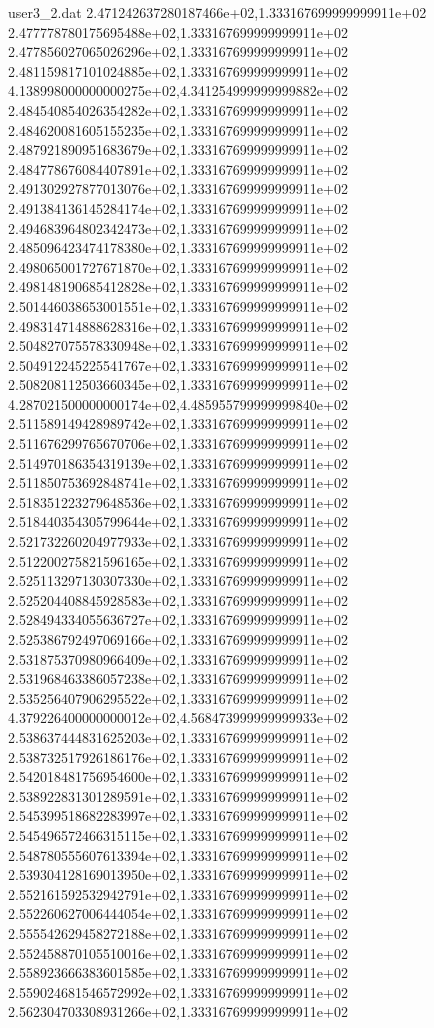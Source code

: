 \begin{filecontents}{user3_2.dat}
2.471242637280187466e+02,1.333167699999999911e+02
2.477778780175695488e+02,1.333167699999999911e+02
2.477856027065026296e+02,1.333167699999999911e+02
2.481159817101024885e+02,1.333167699999999911e+02
4.138998000000000275e+02,4.341254999999999882e+02
2.484540854026354282e+02,1.333167699999999911e+02
2.484620081605155235e+02,1.333167699999999911e+02
2.487921890951683679e+02,1.333167699999999911e+02
2.484778676084407891e+02,1.333167699999999911e+02
2.491302927877013076e+02,1.333167699999999911e+02
2.491384136145284174e+02,1.333167699999999911e+02
2.494683964802342473e+02,1.333167699999999911e+02
2.485096423474178380e+02,1.333167699999999911e+02
2.498065001727671870e+02,1.333167699999999911e+02
2.498148190685412828e+02,1.333167699999999911e+02
2.501446038653001551e+02,1.333167699999999911e+02
2.498314714888628316e+02,1.333167699999999911e+02
2.504827075578330948e+02,1.333167699999999911e+02
2.504912245225541767e+02,1.333167699999999911e+02
2.508208112503660345e+02,1.333167699999999911e+02
4.287021500000000174e+02,4.485955799999999840e+02
2.511589149428989742e+02,1.333167699999999911e+02
2.511676299765670706e+02,1.333167699999999911e+02
2.514970186354319139e+02,1.333167699999999911e+02
2.511850753692848741e+02,1.333167699999999911e+02
2.518351223279648536e+02,1.333167699999999911e+02
2.518440354305799644e+02,1.333167699999999911e+02
2.521732260204977933e+02,1.333167699999999911e+02
2.512200275821596165e+02,1.333167699999999911e+02
2.525113297130307330e+02,1.333167699999999911e+02
2.525204408845928583e+02,1.333167699999999911e+02
2.528494334055636727e+02,1.333167699999999911e+02
2.525386792497069166e+02,1.333167699999999911e+02
2.531875370980966409e+02,1.333167699999999911e+02
2.531968463386057238e+02,1.333167699999999911e+02
2.535256407906295522e+02,1.333167699999999911e+02
4.379226400000000012e+02,4.568473999999999933e+02
2.538637444831625203e+02,1.333167699999999911e+02
2.538732517926186176e+02,1.333167699999999911e+02
2.542018481756954600e+02,1.333167699999999911e+02
2.538922831301289591e+02,1.333167699999999911e+02
2.545399518682283997e+02,1.333167699999999911e+02
2.545496572466315115e+02,1.333167699999999911e+02
2.548780555607613394e+02,1.333167699999999911e+02
2.539304128169013950e+02,1.333167699999999911e+02
2.552161592532942791e+02,1.333167699999999911e+02
2.552260627006444054e+02,1.333167699999999911e+02
2.555542629458272188e+02,1.333167699999999911e+02
2.552458870105510016e+02,1.333167699999999911e+02
2.558923666383601585e+02,1.333167699999999911e+02
2.559024681546572992e+02,1.333167699999999911e+02
2.562304703308931266e+02,1.333167699999999911e+02

\end{filecontents}
